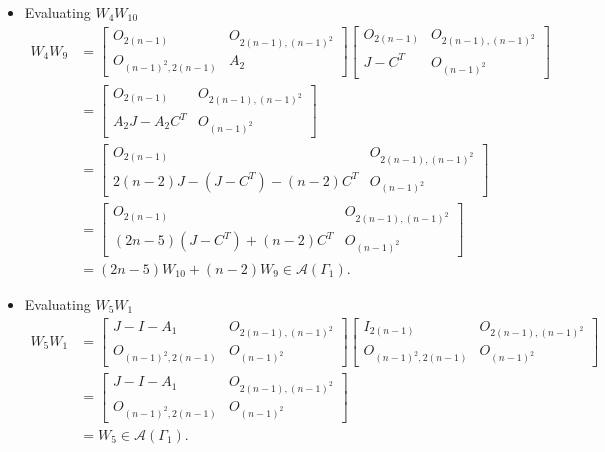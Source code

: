 \begin{itemize}
    \item Evaluating $W_4W_{10}$
    \begin{align*}
        W_4W_9
        &= \begin{bmatrix}
            O_{2(n-1)} & O_{2(n-1), (n-1)^2} \\
            O_{(n-1)^2, 2(n-1)} & A_2
        \end{bmatrix}\begin{bmatrix}
            O_{2(n-1)} & O_{2(n-1), (n-1)^2} \\
            J-C^T & O_{(n-1)^2}
        \end{bmatrix}\\
        &=\begin{bmatrix}
            O_{2(n-1)} & O_{2(n-1), (n-1)^2} \\
            A_2J - A_2C^T & O_{(n-1)^2}
        \end{bmatrix}\\
        &= \begin{bmatrix}
            O_{2(n-1)} & O_{2(n-1), (n-1)^2} \\
            2(n-2)J - (J-C^T) - (n-2)C^T & O_{(n-1)^2}
        \end{bmatrix}\\
        &= \begin{bmatrix}
            O_{2(n-1)} & O_{2(n-1), (n-1)^2} \\
            (2n-5)(J-C^T) + (n-2)C^T & O_{(n-1)^2}
        \end{bmatrix}\\
        &= (2n-5)W_{10} + (n-2)W_9\in\mathcal{A}(\Gamma_1).
    \end{align*}
    
    \item Evaluating $W_5W_1$
    \begin{align*}
        W_5W_1
        &= \begin{bmatrix}
            J-I-A_1 & O_{2(n-1), (n-1)^2} \\
            O_{(n-1)^2, 2(n-1)} & O_{(n-1)^2}
        \end{bmatrix}\begin{bmatrix}
            I_{2(n-1)} & O_{2(n-1), (n-1)^2} \\
            O_{(n-1)^2, 2(n-1)} & O_{(n-1)^2}
        \end{bmatrix}\\
        &= \begin{bmatrix}
            J-I-A_1 & O_{2(n-1), (n-1)^2} \\
            O_{(n-1)^2, 2(n-1)} & O_{(n-1)^2}
        \end{bmatrix}\\
        &=W_5\in\mathcal{A}(\Gamma_1).
    \end{align*}
    

\end{itemize}
